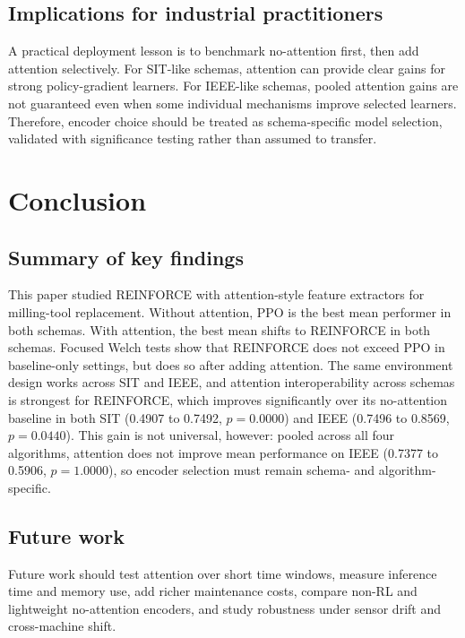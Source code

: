 \documentclass[sn-basic]{sn-jnl}%
\begin{document}
\subsection{Implications for industrial practitioners}
A practical deployment lesson is to benchmark no-attention first, then add attention selectively. For SIT-like schemas, attention can provide clear gains for strong policy-gradient learners. For IEEE-like schemas, pooled attention gains are not guaranteed even when some individual mechanisms improve selected learners. Therefore, encoder choice should be treated as schema-specific model selection, validated with significance testing rather than assumed to transfer.


\section{Conclusion} \label{sec:conclusion} %

\subsection{Summary of key findings}
This paper studied \textsc{REINFORCE} with attention-style feature extractors for milling-tool replacement. Without attention, \textsc{PPO} is the best mean performer in both schemas. With attention, the best mean shifts to \textsc{REINFORCE} in both schemas. Focused Welch tests show that \textsc{REINFORCE} does not exceed \textsc{PPO} in baseline-only settings, but does so after adding attention. The same environment design works across SIT and IEEE, and attention interoperability across schemas is strongest for \textsc{REINFORCE}, which improves significantly over its no-attention baseline in both SIT (0.4907 to 0.7492, $p=0.0000$) and IEEE (0.7496 to 0.8569, $p=0.0440$). This gain is not universal, however: pooled across all four algorithms, attention does not improve mean performance on IEEE (0.7377 to 0.5906, $p=1.0000$), so encoder selection must remain schema- and algorithm-specific.

\subsection{Future work}
Future work should test attention over short time windows, measure inference time and memory use, add richer maintenance costs, compare non-RL and lightweight no-attention encoders, and study robustness under sensor drift and cross-machine shift.
\end{document}
